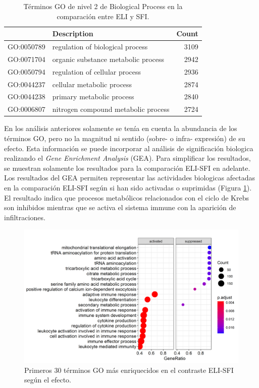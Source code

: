 \documentclass[
]{article}
\begin{document}
\begin{table}

\caption{\label{tab:unnamed-chunk-7}Términos GO de nivel 2 de Biological Process en la comparación entre ELI y SFI.}
\centering
\begin{tabular}[t]{llr}
\toprule
  & Description & Count\\
\midrule
GO:0050789 & regulation of biological process & 3109\\
GO:0071704 & organic substance metabolic process & 2942\\
GO:0050794 & regulation of cellular process & 2936\\
GO:0044237 & cellular metabolic process & 2874\\
GO:0044238 & primary metabolic process & 2840\\
\addlinespace
GO:0006807 & nitrogen compound metabolic process & 2724\\
\bottomrule
\end{tabular}
\end{table}

En los análisis anteriores solamente se tenía en cuenta la abundancia de
los términos GO, pero no la magnitud ni sentido (sobre- o infra-
expresión) de su efecto. Esta información se puede incorporar al
análisis de significación biologica realizando el \emph{Gene Enrichment
Analysis} (GEA). Para simplificar los resultados, se muestran solamente
los resultados para la comparación ELI-SFI en adelante. Los resultados
del GEA permiten representar las actividades biologicas afectadas en la
comparación ELI-SFI según si han sido activadas o suprimidas (Figura
\ref{fig:Fig18}). El resultado indica que procesos metabólicos
relacionados con el ciclo de Krebs son inhibidos mientras que se activa
el sistema immune con la aparición de infiltraciones.

\begin{figure}

{\centering \includegraphics[width=0.8\linewidth]{results/6.GOterms/3.GOupDwn} 

}

\caption{Primeros 30 términos GO más enriquecidos en el contraste ELI-SFI según el efecto.}\label{fig:Fig18}
\end{figure}
\end{document}
